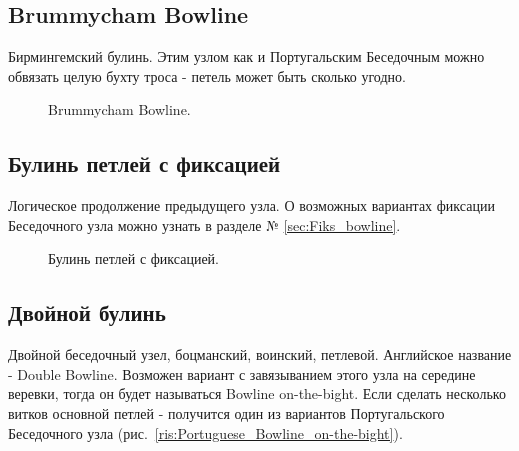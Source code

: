 \subsection{Brummycham Bowline}

Бирмингемский булинь. Этим узлом как и Португальским Беседочным можно обвязать целую бухту троса - петель может быть сколько угодно.

\begin{figure}[H]\centering
	\begin{minipage}{1\linewidth}
		\begin{center}
			\tcbox[enhanced jigsaw,colframe=black,opacityframe=0.5,opacityback=0.5]
			{\centering{}}
		\end{center}
	\end{minipage}
\caption{Brummycham Bowline.}
\label{ris:Brummycham_Bowline}
\end{figure}

\subsection{Булинь петлей с фиксацией}

Логическое продолжение предыдущего узла. О возможных вариантах фиксации Беседочного узла можно узнать в разделе № \ref{sec:Fiks_bowline}.

\begin{figure}[H]\centering
	\begin{minipage}{1\linewidth}
		\begin{center}
			\tcbox[enhanced jigsaw,colframe=black,opacityframe=0.5,opacityback=0.5]
			{\centering{}}
		\end{center}
	\end{minipage}
\caption{Булинь петлей с фиксацией.}
\label{ris:Bowline_petley}
\end{figure}

\subsection{Двойной булинь}

Двойной беседочный узел, боцманский, воинский, петлевой. Английское название - Double Bowline. Возможен вариант с завязыванием этого узла на середине веревки, тогда он будет называться Bowline on-the-bight. Если сделать несколько витков основной петлей - получится один из вариантов Португальского Беседочного узла (рис.~\ref{ris:Portuguese_Bowline_on-the-bight}).

